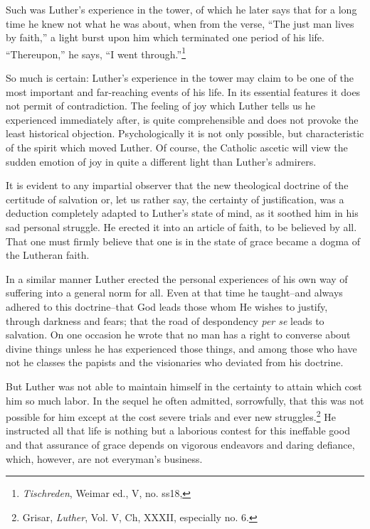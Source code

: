 Such was Luther’s experience in the tower, of which he later says
that for a long time he knew not what he was about, when from the
verse, “The just man lives by faith,” a light burst upon him which terminated one
period of his life. “Thereupon,” he says, “I went through.”\footnote
{\textit{Tischreden}, Weimar ed., V, no. ss18,}

So much is certain: Luther’s experience in the tower may claim to
be one of the most important and far-reaching events of his life. In
its essential features it does not permit of contradiction. The feeling
of joy which Luther tells us he experienced immediately after, is
quite comprehensible and does not provoke the least historical objection.
Psychologically it is not only possible, but characteristic of the
spirit which moved Luther. Of course, the Catholic ascetic will view
the sudden emotion of joy in quite a different light than Luther’s
admirers.

It is evident to any impartial observer that the new theological
doctrine of the certitude of salvation or, let us rather say, the certainty
of justification, was a deduction completely adapted to Luther’s
state of mind, as it soothed him in his sad personal struggle. He
erected it into an article of faith, to be believed by all. That one must
firmly believe that one is in the state of grace became a dogma of the
Lutheran faith.

In a similar manner Luther erected the personal experiences of his
own way of suffering into a general norm for all. Even at that time
he taught--and always adhered to this doctrine--that God leads those
whom He wishes to justify, through darkness and fears; that the
road of despondency \textit{per se} leads to salvation. On one occasion he
wrote that no man has a right to converse about divine things unless
he has experienced those things, and among those who have not he
classes the papists and the visionaries who deviated from his doctrine.

But Luther was not able to maintain himself in the certainty to attain
which cost him so much labor. In the sequel he often admitted,
sorrowfully, that this was not possible for him except at the cost
severe trials and ever new struggles.\footnote
{Grisar, \textit{Luther}, Vol. V, Ch, XXXII, especially no. 6.}
He instructed all that life is
nothing but a laborious contest for this ineffable good and that
assurance of grace depends on vigorous endeavors and daring defiance,
which, however, are not everyman’s business.
